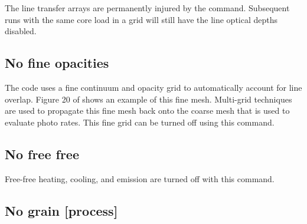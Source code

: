 The line transfer arrays are permanently injured by the
 command.
Subsequent runs with the same core load in a grid will still have
the line optical depths disabled.

\subsection{No fine opacities}

The code uses a fine continuum and opacity grid to automatically account
for line overlap.
Figure 20 of \citet{Shaw2005} shows an example of this
fine mesh.
Multi-grid techniques are used to propagate this fine mesh back
onto the coarse mesh that is used to evaluate photo rates.
This fine grid
can be turned off using this command.

\subsection{No free free}

Free-free heating, cooling, and emission are turned off with this command.

\subsection{No grain [process]}

